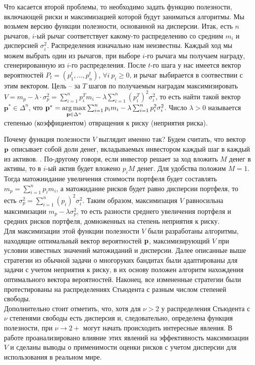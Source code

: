 Что касается второй проблемы, то необходимо задать функцию полезности, включающей риски и максимизацией которой будут заниматься алгоритмы. Мы возьмем версию функции полезности, основанной на дисперсии. Итак, есть $n$ рычагов, $i$-ый рычаг соответствует какому-то распределению со средним $m_i$ и дисперсией $\sigma_i^2$. Распределения изначально нам неизвестны. Каждый ход мы можем выбрать один из рычагов, при выборе $i$-го рычага мы получаем награду, сгенерированную из $i$-го распределения. После $t$-го шага у нас имеется вектор вероятностей $P_t = (p_1^t, ..., p_n^t)$, $\forall i \: p_i \geq 0$, и рычаг выбирается в соотвествии с этим вектором. Цель -- за $T$ шагов по получаемым наградам максимизировать $V = m_p - \lambda \cdot \sigma_p^2 = \sum_{i=1}^n p_i^T m_i - \lambda \sum_{i=1}^n (p_i^T)^2 \sigma_i^2$, то есть найти такой вектор $\textbf{p}^* \in \Delta^n$, что $\textbf{p}^* = \underset{\textbf{p} \in \Delta^n}{\arg \max} \sum_{i=1}^n p_i m_i - \lambda \sum_{i=1}^n p_i^2 \sigma_i^2$. Число $\lambda > 0$ называется степенью (коэффициентом) отвращения к риску (неприятия риска).

Почему функция полезности $V$ выглядит именно так? Будем считать, что вектор $\textbf{p}$ описывает собой доли денег, вкладываемых инвестором каждый шаг в каждый из активов. \cite{bouchaudpotters}. По-другому говоря, если инвестор решает за ход вложить $M$ денег в активы, то в $i$-ый актив будет вложено $p_i M$ денег. Для удобства положим $M=1$. Тогда матожиидание увеличения стоимости портфеля будет составлять $m_p = \sum_{i=1}^n p_i m_i$, а матожидание рисков будет равно дисперсии портфеля, то есть $\sigma_p^2 = \sum_{i=1}^n (p_i)^2 \sigma_i^2$. Таким образом, максимизация $V$ равносильна максимизации $m_p - \lambda \sigma_p^2$, то есть разности среднего увеличения портфеля и средних рисков портфеля, домноженных на степень неприятия к риску. \\

Для максимизации этой функции полезности $V$ были разработаны алгоритмы, находящие оптимальный вектор вероятностей $\textbf{p}$, максимизирующий $V$ при условии известных значений матожиданий и дисперсии. Далее описанные выше стратегии из обычной задачи о многоруких бандитах были адаптированы для задачи с учетом неприятия к риску, в их основу положен алгоритм нахождения оптимального вектора вероятностей. Наконец, все измененные стратегии были протестированы на распределениях Стьюдента с разным числом степеней свободы. \\

Дополнительно стоит отметить, что, хотя для $\nu > 2$ у распределения Стьюдента с $\nu$ степенями свободы есть дисперсия и, следовательно, определена функция полезности, при $\nu \to 2+$ могут начать происходить интересные явления. В работе проанализировано влияние этих явлений на эффективность максимизации $V$ и сделаны выводы о применимости оценки рисков с учетом дисперсии для использования в реальном мире.

